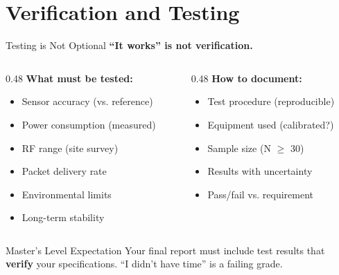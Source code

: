 \documentclass[aspectratio=169,11pt]{beamer}
\begin{document}
\section{Verification and Testing}

\begin{frame}{Testing is Not Optional}
    \textbf{``It works'' is not verification.}
    
    \vspace{0.3cm}
    \begin{columns}[T]
        \begin{column}{0.48\textwidth}
            \textbf{What must be tested:}
            \begin{itemize}
                \item Sensor accuracy (vs. reference)
                \item Power consumption (measured)
                \item RF range (site survey)
                \item Packet delivery rate
                \item Environmental limits
                \item Long-term stability
            \end{itemize}
        \end{column}
        \begin{column}{0.48\textwidth}
            \textbf{How to document:}
            \begin{itemize}
                \item Test procedure (reproducible)
                \item Equipment used (calibrated?)
                \item Sample size (N $\geq$ 30)
                \item Results with uncertainty
                \item Pass/fail vs. requirement
            \end{itemize}
        \end{column}
    \end{columns}
    
    \vspace{0.3cm}
    \begin{alertblock}{Master's Level Expectation}
        Your final report must include test results that \textbf{verify} your specifications. ``I didn't have time'' is a failing grade.
    \end{alertblock}
\end{frame}
\end{document}
